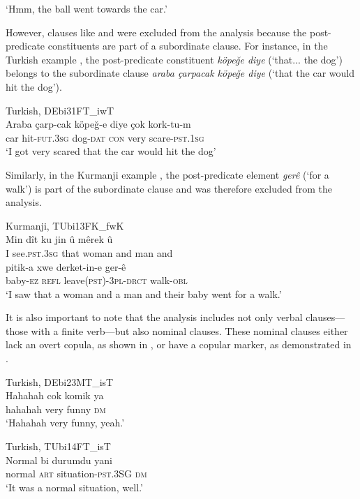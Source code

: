 ‘Hmm, the ball went towards the car.’ 
  \z

However, clauses like  and  were excluded from the analysis because the post-predicate constituents are part of a subordinate clause. For instance, in the Turkish example , the post-predicate constituent \textit{köpeğe diye} (‘that... the dog’) belongs to the subordinate clause \textit{araba çarpacak köpeğe diye} (‘that the car would hit the dog’).

\ea\label{ex:key:33} Turkish, DEbi31FT\_iwT \\
\gll Araba  çarp-cak  köpeğ-e  diye  çok  kork-tu-m \\
car  hit-\textsc{fut}.3\textsc{sg}  dog-\textsc{dat}  \textsc{con}  very  scare-\textsc{pst}.1\textsc{sg}\\
\glt ‘I got very scared that the car would hit the dog’ 
\z

Similarly, in the Kurmanji example , the post-predicate element \textit{gerê} (‘for a walk’) is part of the subordinate clause and was therefore excluded from the analysis.

\ea \label{ex:key:34} Kurmanji, TUbi13FK\_fwK \\
\gll Min   dît     ku   jin     û   mêrek     û \\
I  see.\textsc{pst.3sg}  that  woman    and  man    and\\
\gll pitik-a     xwe   derket-in-e       ger-ê\\
baby-\textsc{ez}  \textsc{refl}  leave(\textsc{pst})-\textsc{3pl-drct}    walk-\textsc{obl}\\
\glt ‘I saw that a woman and a man and their baby went for a walk.’ 
\z

It is also important to note that the analysis includes not only verbal clauses—those with a finite verb—but also nominal clauses. These nominal clauses either lack an overt copula, as shown in , or have a copular marker, as demonstrated in .

\ea%
\label{ex:key:35} Turkish, DEbi23MT\_isT \\
\gll Hahahah  cok  komik  ya \\
hahahah  very  funny  \textsc{dm}\\
\glt ‘Hahahah very funny, yeah.’ 
  \z

\ea%
  \label{ex:key:36} Turkish, TUbi14FT\_isT \\
\gll Normal  bi  durumdu    yani \\
normal  \textsc{art}  situation-\textsc{pst.3SG}  \textsc{dm}\\
\glt ‘It was a normal situation, well.’ 
  \z

